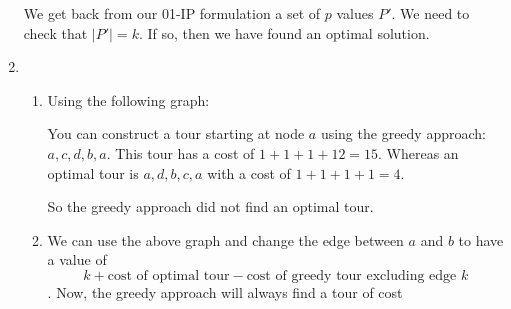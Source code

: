 \documentclass[12pt,letterpaper]{article}
\begin{document}
\begin{enumerate}
      We get back from our 01-IP formulation a set of $p$ values $P'$.
      We need to check that $|P'| = k$.
      If so, then we have found an optimal solution.
    \item
      \begin{enumerate}
        \item
          Using the following graph:


          You can construct a tour starting at node $a$ using the greedy approach: $a, c, d, b, a$.
          This tour has a cost of $1 + 1 + 1 + 12 = 15$.
          Whereas an optimal tour is $a, d, b, c, a$ with a cost of $1 + 1 + 1 + 1 = 4$.

          So the greedy approach did not find an optimal tour.

        \item
          We can use the above graph and change the edge between $a$ and $b$ to have a value of
          \[
            k + \text{cost of optimal tour} - \text{cost of greedy tour excluding edge } k
          \].
          Now, the greedy approach will always find a tour of cost


\end{enumerate}
\end{enumerate}
\end{document}
